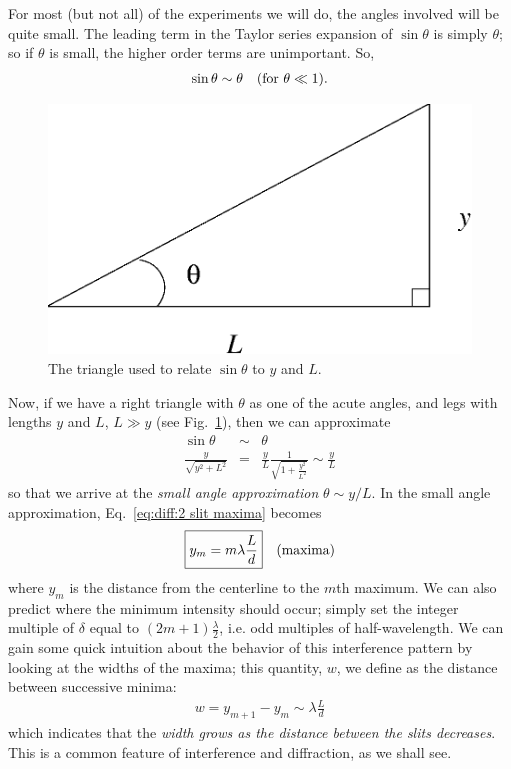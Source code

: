 For most (but not all) of the experiments we will do, the angles involved will be quite 
small.  The leading term in the Taylor series expansion of 
$\sin \theta$ is simply $\theta$; so if $\theta$ is small, the higher order 
terms are unimportant. So,
\begin{eqnarray*}
\sin \theta \sim \theta~~~{\rm (\mbox{for }\theta \ll 1)}.
\end{eqnarray*}
\begin{figure}[htb]
\centering 
\epsfxsize=4cm \includegraphics[scale=0.4]{10_diffraction/triangle.eps}
\caption{The triangle used to relate $\sin\theta$ to $y$ and $L$.} 
\label{fig:diff:triangle}
\end{figure}
Now, if we have a right triangle with $\theta$ as one of the acute angles, and
legs with lengths $y$ and $L$, $L \gg y$ (see Fig.~\ref{fig:diff:triangle}), 
then we can approximate
\begin{eqnarray*}
\sin \theta &\sim& \theta \\
\frac{y}{\sqrt{y^2+L^2}} &=& \frac{y}{L}
\frac{1}{\sqrt{1+\frac{y^2}{L^2}}}
\sim \frac{y}{L}
\end{eqnarray*}
so that we arrive at the {\em small angle approximation} $\theta \sim y/L$.
In the small angle approximation, Eq.~\ref{eq:diff:2 slit maxima}
becomes
\begin{eqnarray}
\fbox{$ \displaystyle y_m=m \lambda \frac{L}{d} $}~~~{\rm (maxima)}
\end{eqnarray}
where $y_m$ is the distance from the centerline to the $m$th maximum.
We can also predict where the minimum intensity should occur; simply set
the integer multiple of $\delta$ equal to $(2m+1) \frac{\lambda}{2}$,
i.e. odd multiples of half-wavelength.
We can gain some quick intuition about the behavior of this interference 
pattern by looking at the widths of the maxima; this quantity, $w$, 
we define as the distance between successive minima:
\begin{eqnarray*}
w = y_{m+1}-y_m \sim \lambda \frac{L}{d}
\end{eqnarray*}
which indicates that the {\it width grows as the distance between the slits 
decreases}. This is a common feature of interference and 
diffraction, as we shall see.

